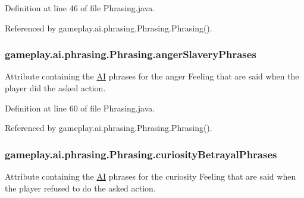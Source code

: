 Definition at line 46 of file Phrasing.\-java.



Referenced by gameplay.\-ai.\-phrasing.\-Phrasing.\-Phrasing().

\hypertarget{classgameplay_1_1ai_1_1phrasing_1_1_phrasing_a1c50856055990e9a1c22fd2b364bdf85}{
\subsubsection[{anger\-Slavery\-Phrases}]{ gameplay.\-ai.\-phrasing.\-Phrasing.\-anger\-Slavery\-Phrases\hspace{0.3cm}{\ttfamily [protected]}}}\label{classgameplay_1_1ai_1_1phrasing_1_1_phrasing_a1c50856055990e9a1c22fd2b364bdf85}


Attribute containing the \hyperlink{classgameplay_1_1ai_1_1_a_i}{A\-I} phrases for the anger Feeling that are said when the player did the asked action. 



Definition at line 60 of file Phrasing.\-java.



Referenced by gameplay.\-ai.\-phrasing.\-Phrasing.\-Phrasing().

\hypertarget{classgameplay_1_1ai_1_1phrasing_1_1_phrasing_a10f436b3727af6eedab39a382801306c}{
\subsubsection[{curiosity\-Betrayal\-Phrases}]{ gameplay.\-ai.\-phrasing.\-Phrasing.\-curiosity\-Betrayal\-Phrases\hspace{0.3cm}{\ttfamily [protected]}}}\label{classgameplay_1_1ai_1_1phrasing_1_1_phrasing_a10f436b3727af6eedab39a382801306c}


Attribute containing the \hyperlink{classgameplay_1_1ai_1_1_a_i}{A\-I} phrases for the curiosity Feeling that are said when the player refused to do the asked action. 



